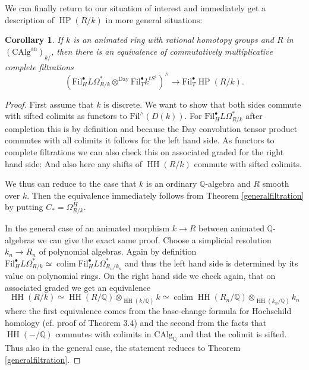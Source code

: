 \documentclass[10pt, reqno]{amsart}
\newtheorem{corollary}[theorem]{Corollary}
\theoremstyle{definition}
\theoremstyle{remark}
\newcommand{\Q}{\mathbb{Q}}
\newcommand{\CAlg}{\mathrm{CAlg}}
\newcommand{\dr}[3]{\Omega^{#3}_{#1/#2}}
\DeclareMathOperator{\colim}{\mathrm{colim}}
\newcommand{\Fil}{\mathrm{Fil}}
\newcommand{\Day}{\mathrm{Day}}
\newcommand{\an}{\mathrm{an}}
\DeclareMathOperator{\HH}{\mathrm{HH}}
\DeclareMathOperator{\HP}{\mathrm{HP}}
\begin{document}
We can finally return to our situation of interest and immediately get a description of $\HP(R/k)$ in more general situations:

\begin{corollary}\label{main filtration}
	If $k$ is an animated ring with rational homotopy groups and $R$ in $(\CAlg^\an)_{k/}$, then there is an equivalence of commutatively multiplicative complete filtrations
		\begin{equation}\label{filtration}\left(\Fil_H^\bullet L\dr Rk*\otimes^\Day\Fil_T^\bullet k^{tS^1}\right)^\wedge\to \Fil_T^\bullet\HP(R/k).\end{equation}
\end{corollary}
\begin{proof}
	First assume that $k$ is discrete. We want to show that both sides commute with sifted colimits as functors to $\Fil^\wedge(D(k))$. For $\Fil_H^\bullet L\dr Rk*$ after completion this is by definition and because the Day convolution tensor product commutes with all colimits it follows for the left hand side. As functors to complete filtrations we can also check this on associated graded for the right hand side: And also here any shifts of $\HH(R/k)$ commute with sifted colimits.
	
	We thus can reduce to the case that $k$ is an ordinary $\Q$-algebra and $R$ smooth over $k$. Then the equivalence immediately follows from Theorem \ref{generalfiltration} by putting $C_*=\dr RkH$.
	
	
	In the general case of an animated morphism $k\to R$ between animated $\Q$-algebras we can give the exact same proof. Choose a simplicial resolution $k_n\to R_n$ of polynomial algebras. Again by definition $\Fil_H^\bullet L\dr Rk*\simeq\colim \Fil_H^\bullet L\dr {R_n}{k_n}*$ and thus the left hand side is determined by its value on polynomial rings. On the right hand side we check again, that on associated graded we get an equivalence
	\[\HH(R/k)\simeq\HH(R/\Q)\otimes_{\HH(k/\Q)}k\simeq\colim \HH(R_n/\Q)\otimes_{\HH(k_n/\Q)} k_n\] 
	where the first equivalence comes from the base-change formula for Hochschild homology (cf. \cite{AMN17} proof of Theorem 3.4) and the second from the facts that $\HH(-/\Q)$ commutes with colimits in $\CAlg_\Q$ and that the colimit is sifted. Thus also in the general case, the statement reduces to Theorem \ref{generalfiltration}.
\end{proof}
\end{document}
